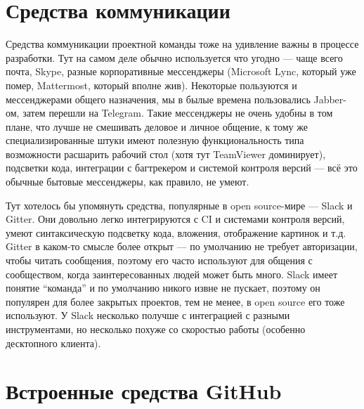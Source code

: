 \documentclass[a5paper]{article}
\begin{document}
\section{Средства коммуникации}

Средства коммуникации проектной команды тоже на удивление важны в процессе разработки. Тут на самом деле обычно используется что угодно --- чаще всего почта, Skype, разные корпоративные мессенджеры (Microsoft Lync, который уже помер, Mattermost, который вполне жив). Некоторые пользуются и мессенджерами общего назначения, мы в былые времена пользовались Jabber-ом, затем перешли на Telegram. Такие мессенджеры не очень удобны в том плане, что лучше не смешивать деловое и личное общение, к тому же специализированные штуки имеют полезную функциональность типа возможности расшарить рабочий стол (хотя тут TeamViewer доминирует), подсветки кода, интеграции с багтрекером и системой контроля версий --- всё это обычные бытовые мессенджеры, как правило, не умеют.

Тут хотелось бы упомянуть средства, популярные в open source-мире --- Slack и Gitter. Они довольно легко интегрируются с CI и системами контроля версий, умеют синтаксическую подсветку кода, вложения, отображение картинок и т.д. Gitter в каком-то смысле более открыт --- по умолчанию не требует авторизации, чтобы читать сообщения, поэтому его часто используют для общения с сообществом, когда заинтересованных людей может быть много. Slack имеет понятие ``команда'' и по умолчанию никого извне не пускает, поэтому он популярен для более закрытых проектов, тем не менее, в open source его тоже используют. У Slack несколько получше с интеграцией с разными инструментами, но несколько похуже со скоростью работы (особенно десктопного клиента).

\section{Встроенные средства GitHub}
\end{document}
